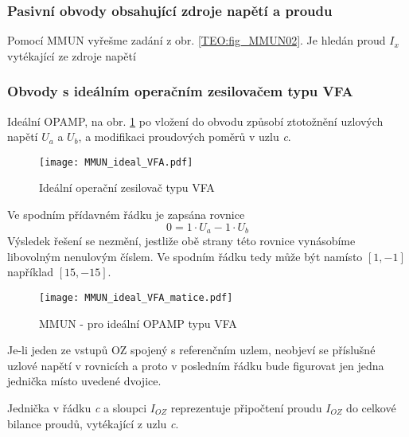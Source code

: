 {        \subsubsection{Pasivní obvody obsahující zdroje napětí a proudu}
          Pomocí MMUN vyřešme zadání z obr. \ref{TEO:fig_MMUN02}. Je hledán proud \(I_x\) vytékající 
          ze zdroje napětí 
              
        \subsubsection{Obvody s ideálním operačním zesilovačem ty\-pu VFA}
          Ideální OPAMP, na obr. \ref{TEO:fig_MMUN_ideal_VFA} po vložení do obvodu způsobí 
          ztotožnění uzlových napětí $U_a$ a $U_b$, a modifikaci proudových poměrů v uzlu \emph{c}.
      
          \begin{figure}[ht!]
            \centering
            \texttt{[image: MMUN\_ideal\_VFA.pdf]}
            \caption[Ideální operační zesilovač typu VFA]{Ideální operační zesilovač typu VFA}
            \label{TEO:fig_MMUN_ideal_VFA}
          \end{figure}
          Ve spodním přídavném řádku je zapsána rovnice
          \begin{equation}\label{TEO:eq_MMUN_VFA}
              0 = 1\cdot U_a - 1\cdot U_b
          \end{equation}
          Výsledek řešení se nezmění, jestliže obě strany této rovnice vynásobíme libovolným 
          nenulovým číslem. Ve spodním řádku tedy může být namísto $[1,-1]$ například $[15,-15]$.
          \begin{figure}[ht!]
            \centering
            \texttt{[image: MMUN\_ideal\_VFA\_matice.pdf]}
            \caption[MMUN - pro ideální OPAMP]{MMUN - pro ideální OPAMP typu VFA}
            \label{TEO:fig_MMUN_VFA_matice}
          \end{figure}
          Je-li jeden ze vstupů OZ spojený s referenčním uzlem, neobjeví se příslušné uzlové napětí 
          v rovnicích a proto v posledním řádku bude figurovat jen jedna jednička místo uvedené 
          dvojice. 
          
          Jednička v řádku \emph{c} a sloupci $I_{OZ}$ reprezentuje připočtení proudu $I_{OZ}$ do 
          celkové bilance proudů, vytékající z uzlu \emph{c}.
        
}
